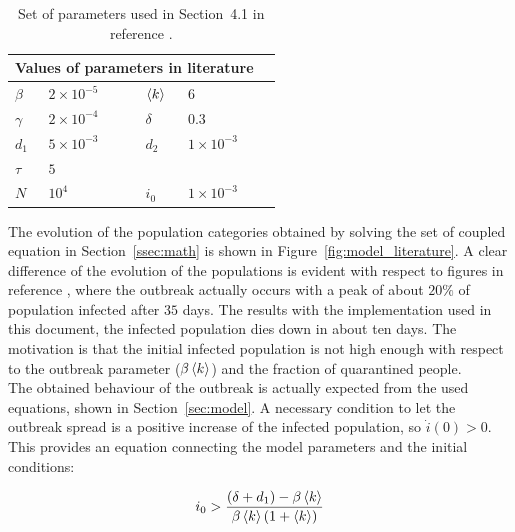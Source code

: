 \begin{table}
\centering
\begin{tabular}{@{}llllll@{}}
\toprule
\multicolumn{5}{l}{Values of parameters in literature}\\
\midrule
$\beta$ & $2\times10^{-5}$ & \phantom{aaa} & $\braket{k}$ & $6$ \\
$\gamma$ & $2\times10^{-4}$ & \phantom{aaa} & $\delta$ & $0.3$ \\
$d_1$ & $5\times10^{-3}$ & \phantom{aaa} & $d_2$ & $1\times10^{-3}$ \\
$\tau$ & $5$ & \phantom{aaa} & & \\ [2mm]
$N$ & $10^4$ & \phantom{aaa} & $i_0$ & $1\times10^{-3}$\\
\bottomrule
\end{tabular}
\caption{Set of parameters used in Section~4.1 in reference \cite{MingLiu,MingLiuOld}.}
\label{tab:literature_parameters}
\end{table}

The evolution of the population categories obtained by solving the set of coupled equation in Section~\ref{ssec:math} is shown in Figure~\ref{fig:model_literature}. A clear difference of the evolution of the populations is evident with respect to figures in reference \cite{MingLiu}, where the outbreak actually occurs with a peak of about $20\%$ of population infected after $35$ days. The results with the implementation used in this document, the infected population dies down in about ten days. The motivation is that the initial infected population is not high enough with respect to the outbreak parameter ($\beta\braket{k}$) and the fraction of quarantined people. \\

The obtained behaviour of the outbreak is actually expected from the used equations, shown in Section~\ref{sec:model}. A necessary condition to let the outbreak spread is a positive increase of the infected population, so $\dot{i}(0)>0$. This provides an equation connecting the model parameters and the initial conditions:

\begin{equation}
i_0 > \frac{\left(\delta+d_1\right)-\beta\braket{k}}{\beta\braket{k}(1+\braket{k})}
\label{eqn:i0dotgtr0}
\end{equation}

